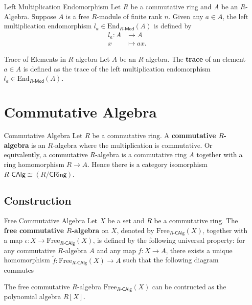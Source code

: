 \begin{example}{Left Multiplication Endomorphism}{}
    Let $R$ be a commutative ring and $A$ be an $R$-Algebra. Suppose $A$ is a free $R$-module of finite rank $n$. Given any $a\in A$, the left multiplication endomorphism $l_a\in\mathrm{End}_{R\text{-}\mathsf{Mod}}(A)$ is defined by
    \begin{align*}
        l_a:A &\longrightarrow A\\
        x &\longmapsto ax.
    \end{align*}
\end{example}


\begin{definition}{Trace of Elements in $R$-algebra}{}
    Let $A$ be an $R$-algebra. The \textbf{trace} of an element $a\in A$ is defined as the trace of the left multiplication endomorphism $l_a\in\mathrm{End}_{R\text{-}\mathsf{Mod}}(A)$.
\end{definition}




\section{Commutative Algebra}
\begin{definition}{Commutative Algebra}{}
    Let $R$ be a commutative ring. A \textbf{commutative $R$-algebra} is an $R$-algebra where the multiplication is commutative. Or equivalently, a commutative $R$-algebra is a commutative ring $A$ together with a ring homomorphism $R\to A$. Hence there is a category isomorphism $R\text{-}\mathsf{CAlg}\cong \left(R/\mathsf{CRing}\right)$.
\end{definition}

\subsection{Construction}

\begin{definition}{Free Commutative Algebra}{}
    Let $X$ be a set and $R$ be a commutative ring. The \textbf{free commutative $R$-algebra} on $X$, denoted by $\mathrm{Free}_{R\text{-}\mathsf{CAlg}}(X)$, together with a map $\iota:X\to \mathrm{Free}_{R\text{-}\mathsf{CAlg}}(X)$, is defined by the following universal property: for any commutative $R$-algebra $A$ and any map $f:X\to A$, there exists a unique homomorphism $\widetilde{f}:\mathrm{Free}_{R\text{-}\mathsf{CAlg}}(X)\to A$ such that the following diagram commutes
    \begin{center}
    \end{center}
    The free commutative $R$-algebra $\mathrm{Free}_{R\text{-}\mathsf{CAlg}}(X)$ can be contructed as the polynomial algebra $R[X]$.
\end{definition}


